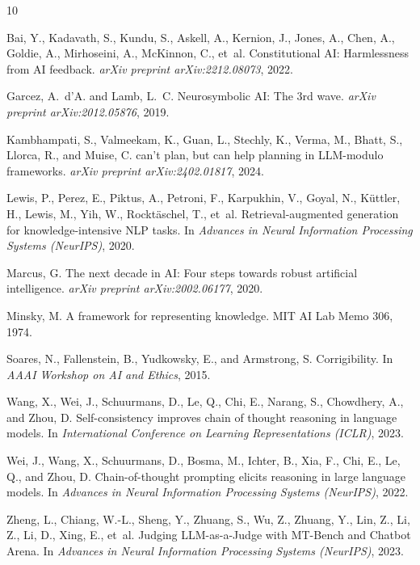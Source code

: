 \documentclass[11pt,a4paper]{article}
\begin{document}
\begin{thebibliography}{10}

Bai, Y., Kadavath, S., Kundu, S., Askell, A., Kernion, J., Jones, A., Chen, A., Goldie, A., Mirhoseini, A., McKinnon, C., et~al.
\newblock Constitutional {AI}: Harmlessness from {AI} feedback.
\newblock \emph{arXiv preprint arXiv:2212.08073}, 2022.

Garcez, A.~d'A. and Lamb, L.~C.
\newblock Neurosymbolic {AI}: The 3rd wave.
\newblock \emph{arXiv preprint arXiv:2012.05876}, 2019.

Kambhampati, S., Valmeekam, K., Guan, L., Stechly, K., Verma, M., Bhatt, S., Llorca, R., and Muise, C.
 can't plan, but can help planning in {LLM}-modulo frameworks.
\newblock \emph{arXiv preprint arXiv:2402.01817}, 2024.

Lewis, P., Perez, E., Piktus, A., Petroni, F., Karpukhin, V., Goyal, N., K{\"u}ttler, H., Lewis, M., Yih, W., Rockt{\"a}schel, T., et~al.
\newblock Retrieval-augmented generation for knowledge-intensive {NLP} tasks.
\newblock In \emph{Advances in Neural Information Processing Systems (NeurIPS)}, 2020.

Marcus, G.
\newblock The next decade in {AI}: Four steps towards robust artificial intelligence.
\newblock \emph{arXiv preprint arXiv:2002.06177}, 2020.

Minsky, M.
\newblock A framework for representing knowledge.
\newblock MIT AI Lab Memo 306, 1974.

Soares, N., Fallenstein, B., Yudkowsky, E., and Armstrong, S.
\newblock Corrigibility.
\newblock In \emph{AAAI Workshop on AI and Ethics}, 2015.

Wang, X., Wei, J., Schuurmans, D., Le, Q., Chi, E., Narang, S., Chowdhery, A., and Zhou, D.
\newblock Self-consistency improves chain of thought reasoning in language models.
\newblock In \emph{International Conference on Learning Representations (ICLR)}, 2023.

Wei, J., Wang, X., Schuurmans, D., Bosma, M., Ichter, B., Xia, F., Chi, E., Le, Q., and Zhou, D.
\newblock Chain-of-thought prompting elicits reasoning in large language models.
\newblock In \emph{Advances in Neural Information Processing Systems (NeurIPS)}, 2022.

Zheng, L., Chiang, W.-L., Sheng, Y., Zhuang, S., Wu, Z., Zhuang, Y., Lin, Z., Li, Z., Li, D., Xing, E., et~al.
\newblock Judging {LLM}-as-a-Judge with {MT-Bench} and {Chatbot Arena}.
\newblock In \emph{Advances in Neural Information Processing Systems (NeurIPS)}, 2023.

\end{thebibliography}
\end{document}
